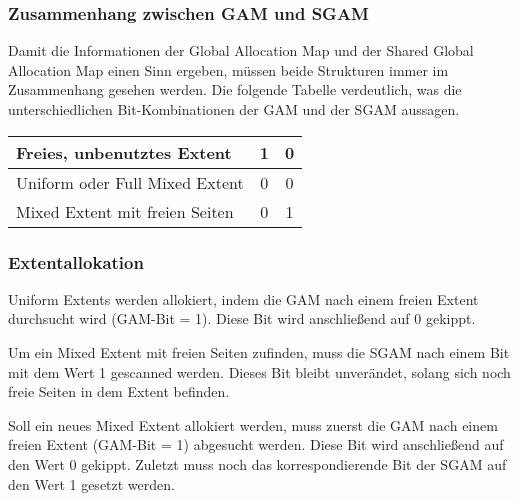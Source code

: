         \subsubsection{Zusammenhang zwischen GAM und SGAM}
          Damit die Informationen der Global Allocation Map und der Shared
          Global Allocation Map einen Sinn ergeben, müssen beide Strukturen
          immer im Zusammenhang gesehen werden. Die folgende Tabelle
          verdeutlich, was die unterschiedlichen Bit-Kombinationen der GAM und
          der SGAM aussagen.
          \begin{center}
            \label{gamandsgam}
            \begin{small}
              \tabletail{
                \hline
              }
              \tablelasttail{
                \hline
              }
              \begin{supertabular}{|l|c|c|}
                Freies, unbenutztes Extent & 1 & 0 \\
                \hline
                Uniform oder Full Mixed Extent & 0 & 0 \\
                \hline
                Mixed Extent mit freien Seiten & 0 & 1 \\
              \end{supertabular}
            \end{small}
          \end{center}
      \subsubsection{Extentallokation}
        Uniform Extents werden allokiert, indem die GAM nach einem freien Extent
        durchsucht wird (GAM-Bit = 1). Diese Bit wird anschließend auf 0
        gekippt.

        Um ein Mixed Extent mit freien Seiten zufinden, muss die SGAM nach einem
        Bit mit dem Wert 1 gescanned werden. Dieses Bit bleibt unverändet,
        solang sich noch freie Seiten in dem Extent befinden.

        Soll ein neues Mixed Extent allokiert werden, muss zuerst die GAM nach
        einem freien Extent (GAM-Bit = 1) abgesucht werden. Diese Bit wird
        anschließend auf den Wert 0 gekippt. Zuletzt muss noch das
        korrespondierende Bit der SGAM auf den Wert 1 gesetzt werden.
